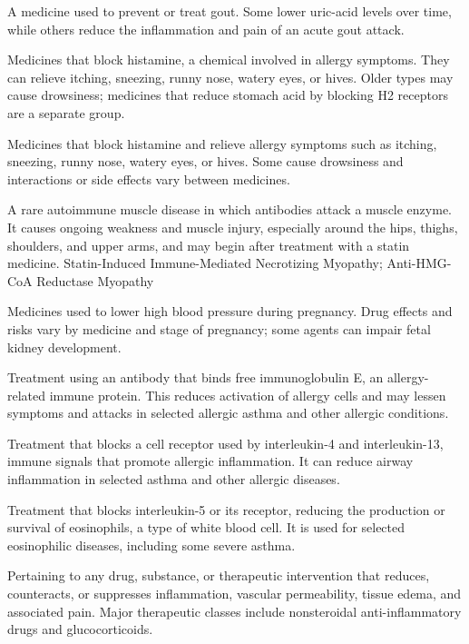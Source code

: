  A medicine used to prevent or treat gout. Some lower uric-acid levels over time, while others reduce the inflammation and pain of an acute gout attack.

 Medicines that block histamine, a chemical involved in allergy symptoms. They can relieve itching, sneezing, runny nose, watery eyes, or hives. Older types may cause drowsiness; medicines that reduce stomach acid by blocking H2 receptors are a separate group.

 Medicines that block histamine and relieve allergy symptoms such as itching, sneezing, runny nose, watery eyes, or hives. Some cause drowsiness and interactions or side effects vary between medicines.

 A rare autoimmune muscle disease in which antibodies attack a muscle enzyme. It causes ongoing weakness and muscle injury, especially around the hips, thighs, shoulders, and upper arms, and may begin after treatment with a statin medicine.
\synonyms
Statin-Induced Immune-Mediated Necrotizing Myopathy; Anti-HMG-CoA Reductase Myopathy

 Medicines used to lower high blood
pressure during pregnancy. Drug effects and risks vary by medicine and stage of
pregnancy; some agents can impair fetal kidney development.

 Treatment using an antibody that binds free immunoglobulin E, an allergy-related immune protein. This reduces activation of allergy cells and may lessen symptoms and attacks in selected allergic asthma and other allergic conditions.

 Treatment that blocks a cell receptor used by interleukin-4 and interleukin-13, immune signals that promote allergic inflammation. It can reduce airway inflammation in selected asthma and other allergic diseases.

 Treatment that blocks interleukin-5 or its receptor, reducing the production or survival of eosinophils, a type of white blood cell. It is used for selected eosinophilic diseases, including some severe asthma.

 Pertaining to any drug, substance, or therapeutic intervention that reduces, counteracts, or suppresses inflammation, vascular permeability, tissue edema, and associated pain. Major therapeutic classes include nonsteroidal anti-inflammatory drugs and glucocorticoids.

